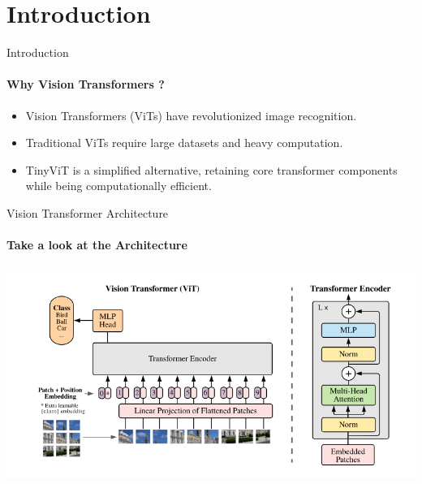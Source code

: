\section{Introduction}

\begin{frame}{Introduction}
  \framesubtitle{Why Vision Transformers ?}
  \begin{itemize}
    \item Vision Transformers (ViTs) have revolutionized image recognition.
    \item Traditional ViTs require large datasets and heavy computation.
    \item TinyViT is a simplified alternative, retaining core transformer components while being computationally efficient.
  \end{itemize}
\end{frame}

\begin{frame}{Vision Transformer Architecture}
  \framesubtitle{Take a look at the Architecture}
  \includegraphics[width=\textwidth]{images/vit-architecture.png}
\end{frame}

